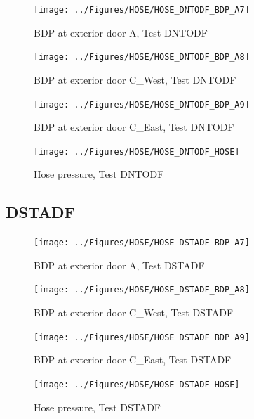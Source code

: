 \documentclass[11pt,oneside]{book}
\begin{document}
\begin{figure}[!ht]
\texttt{[image: ../Figures/HOSE/HOSE\_DNTODF\_BDP\_A7]}
\caption{BDP at exterior door A, Test DNTODF}
\label{fig:HOSE_DNTODF_BDP_A7}
\end{figure}

\begin{figure}[!ht]
\texttt{[image: ../Figures/HOSE/HOSE\_DNTODF\_BDP\_A8]}
\caption{BDP at exterior door C\_West, Test DNTODF}
\label{fig:HOSE_DNTODF_BDP_A8}
\end{figure}

\begin{figure}[!ht]
\texttt{[image: ../Figures/HOSE/HOSE\_DNTODF\_BDP\_A9]}
\caption{BDP at exterior door C\_East, Test DNTODF}
\label{fig:HOSE_DNTODF_BDP_A9}
\end{figure}

\begin{figure}[!ht]
\texttt{[image: ../Figures/HOSE/HOSE\_DNTODF\_HOSE]}
\caption{Hose pressure, Test DNTODF}
\label{fig:HOSE_DNTODF_HOSE}
\end{figure}


\clearpage


\subsection{DSTADF}

\begin{figure}[!ht]
\texttt{[image: ../Figures/HOSE/HOSE\_DSTADF\_BDP\_A7]}
\caption{BDP at exterior door A, Test DSTADF}
\label{fig:HOSE_DSTADF_BDP_A7}
\end{figure}

\begin{figure}[!ht]
\texttt{[image: ../Figures/HOSE/HOSE\_DSTADF\_BDP\_A8]}
\caption{BDP at exterior door C\_West, Test DSTADF}
\label{fig:HOSE_DSTADF_BDP_A8}
\end{figure}

\begin{figure}[!ht]
\texttt{[image: ../Figures/HOSE/HOSE\_DSTADF\_BDP\_A9]}
\caption{BDP at exterior door C\_East, Test DSTADF}
\label{fig:HOSE_DSTADF_BDP_A9}
\end{figure}

\begin{figure}[!ht]
\texttt{[image: ../Figures/HOSE/HOSE\_DSTADF\_HOSE]}
\caption{Hose pressure, Test DSTADF}
\label{fig:HOSE_DSTADF_HOSE}
\end{figure}


\clearpage
\end{document}
